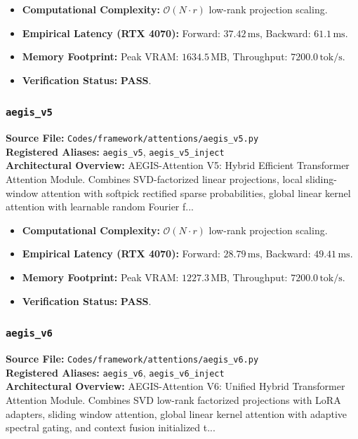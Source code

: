 \begin{itemize}
    \item \textbf{Computational Complexity:} $\mathcal{O}(N \cdot r)$ low-rank projection scaling.
    \item \textbf{Empirical Latency (RTX 4070):} Forward: $37.42\,\text{ms}$, Backward: $61.1\,\text{ms}$.
    \item \textbf{Memory Footprint:} Peak VRAM: $1634.5\,\text{MB}$, Throughput: $7200.0\,\text{tok/s}$.
    \item \textbf{Verification Status:} \textbf{PASS}.
\end{itemize}

\subsubsection{\texttt{aegis\_v5}}
\textbf{Source File:} \texttt{Codes/framework/attentions/aegis\_v5.py} \\
\textbf{Registered Aliases:} \texttt{aegis\_v5}, \texttt{aegis\_v5\_inject} \\
\textbf{Architectural Overview:} AEGIS-Attention V5: Hybrid Efficient Transformer Attention Module. Combines SVD-factorized linear projections, local sliding-window attention with softpick rectified sparse probabilities, global linear kernel attention with learnable random Fourier f...

\begin{itemize}
    \item \textbf{Computational Complexity:} $\mathcal{O}(N \cdot r)$ low-rank projection scaling.
    \item \textbf{Empirical Latency (RTX 4070):} Forward: $28.79\,\text{ms}$, Backward: $49.41\,\text{ms}$.
    \item \textbf{Memory Footprint:} Peak VRAM: $1227.3\,\text{MB}$, Throughput: $7200.0\,\text{tok/s}$.
    \item \textbf{Verification Status:} \textbf{PASS}.
\end{itemize}

\subsubsection{\texttt{aegis\_v6}}
\textbf{Source File:} \texttt{Codes/framework/attentions/aegis\_v6.py} \\
\textbf{Registered Aliases:} \texttt{aegis\_v6}, \texttt{aegis\_v6\_inject} \\
\textbf{Architectural Overview:} AEGIS-Attention V6: Unified Hybrid Transformer Attention Module. Combines SVD low-rank factorized projections with LoRA adapters, sliding window attention, global linear kernel attention with adaptive spectral gating, and context fusion initialized t...

